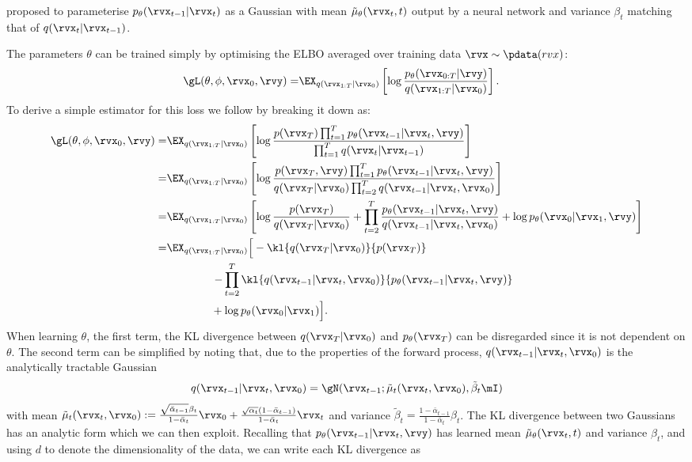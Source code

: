 \citet{ho2020denoising} proposed to parameterise $p_\theta(\rvx_{t-1}|\rvx_t)$ as a Gaussian with mean $\tilde{\mathbf{\mu}}_\theta(\rvx_t, t)$ output by a neural network and variance $\beta_t$ matching that of $q(\rvx_t|\rvx_{t-1})$.

The parameters $\theta$ can be trained simply by optimising the ELBO averaged over training data $\rvx \sim \pdata(rvx)$:
\begin{align}
    \gL(\theta, \phi, \rvx_0, \rvy) =& \EX_{q(\rvx_{1:T}|\rvx_0)} \left[ \log \frac{p_\theta(\rvx_{0:T}|\rvy)}{q(\rvx_{1:T}|\rvx_0)} \right].
\end{align}
To derive a simple estimator for this loss we follow \citet{ho2020denoising} by breaking it down as:
\begin{align}
    \gL(\theta, \phi, \rvx_0, \rvy) =& \EX_{q(\rvx_{1:T}|\rvx_0)} \left[ \log \frac{p(\rvx_T) \prod_{t=1}^T p_\theta(\rvx_{t-1}|\rvx_t, \rvy)}{\prod_{t=1}^T q(\rvx_t|\rvx_{t-1})} \right] \\
    =& \EX_{q(\rvx_{1:T}|\rvx_0)} \left[ \log \frac{p(\rvx_T, \rvy) \prod_{t=1}^T p_\theta(\rvx_{t-1}|\rvx_t, \rvy)}{q(\rvx_T|\rvx_0) \prod_{t=2}^T q(\rvx_{t-1}|\rvx_t,\rvx_0)} \right] \\
    =& \EX_{q(\rvx_{1:T}|\rvx_0)} \left[ \log \frac{p(\rvx_T)}{q(\rvx_T|\rvx_0)} + \prod_{t=2}^T \frac{p_\theta(\rvx_{t-1}|\rvx_t, \rvy)}{q(\rvx_{t-1}|\rvx_t,\rvx_0)} + \log p_\theta(\rvx_0|\rvx_1, \rvy) \right] \\
    =& \EX_{q(\rvx_{1:T}|\rvx_0)} \Big[ -\kl{q(\rvx_T|\rvx_0)}{p(\rvx_T)} \nonumber \\
    &\qquad\qquad \left. - \prod_{t=2}^T \kl{q(\rvx_{t-1}|\rvx_t,\rvx_0)}{p_\theta(\rvx_{t-1}|\rvx_t, \rvy)} \right. \nonumber \\
    &\qquad\qquad + \log p_\theta(\rvx_0|\rvx_1) \Big].
\end{align}
When learning $\theta$, the first term, the KL divergence between $q(\rvx_T|\rvx_0)$ and $p_\theta(\rvx_T)$ can be disregarded since it is not dependent on $\theta$. 
The second term can be simplified by noting that, due to the properties of the forward process, $q(\rvx_{t-1}|\rvx_t,\rvx_0)$ is the analytically tractable Gaussian
\begin{equation}
    q(\rvx_{t-1}|\rvx_t, \rvx_0) = \gN ( \rvx_{t-1} ; \tilde{\mathbf{\mu}}_t(\rvx_t,\rvx_0), \tilde{\beta}_t \mI )
\end{equation}
with mean $\tilde{\mathbf{\mu}}_t(\rvx_t,\rvx_0) := \frac{\sqrt{\bar{\alpha}_{t-1}}\beta_t}{1-\bar{\alpha}_t}\rvx_0 + \frac{\sqrt{\alpha_t}(1-\bar{\alpha}_{t-1})}{1-\bar{\alpha}_t}\rvx_t$ and variance $\tilde{\beta}_t = \frac{1-\bar{\alpha}_{t-1}}{1-\bar{\alpha}_t} \beta_t$. The KL divergence between two Gaussians has an analytic form which we can then exploit. Recalling that $p_\theta(\rvx_{t-1}|\rvx_t, \rvy)$ has learned mean $\tilde{\mathbf{\mu}}_\theta(\rvx_t, t)$ and variance $\beta_t$, and using $d$ to denote the dimensionality of the data, we can write each KL divergence as
